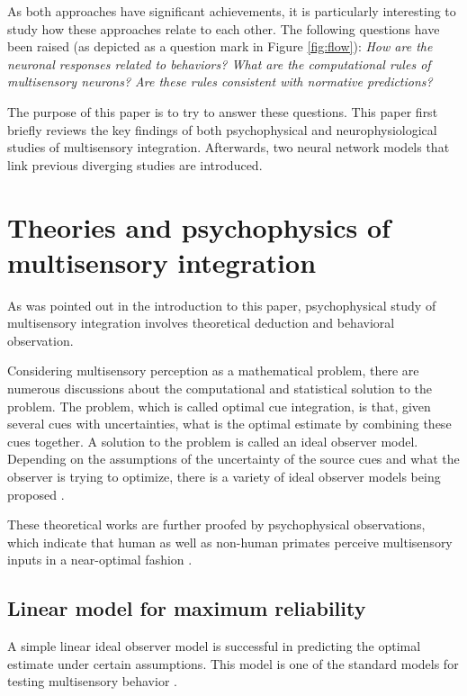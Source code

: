 \documentclass{article}[11pt]
\begin{document}
As both approaches have significant achievements, it is particularly interesting to study how these approaches relate to each other. The following questions have been raised (as depicted as a question mark in Figure \ref{fig:flow}): \emph{How are the neuronal responses related to behaviors? What are the computational rules of multisensory neurons? Are these rules consistent with normative predictions?} 

The purpose of this paper is to try to answer these questions. This paper first briefly reviews the key findings of both psychophysical and neurophysiological studies of multisensory integration. Afterwards, two neural network models that link previous diverging studies are introduced.

\section{Theories and psychophysics of multisensory integration}
As was pointed out in the introduction to this paper, psychophysical study of multisensory integration involves theoretical deduction and behavioral observation.

Considering multisensory perception as a mathematical problem, there are numerous discussions about the computational and statistical solution to the problem. The problem, which is called optimal cue integration, is that, given several cues with uncertainties, what is the optimal estimate by combining these cues together. A solution to the problem is called an ideal observer model. Depending on the assumptions of the uncertainty of the source cues and what the observer is trying to optimize, there is a variety of ideal observer models being proposed \cite{landy_ideal-observer_2011}.

These theoretical works are further proofed by psychophysical observations, which indicate that human as well as non-human primates perceive multisensory inputs in a near-optimal fashion \cite{ernst_humans_2002,alais_ventriloquist_2004,gu_neural_2008}.

\subsection{Linear model for maximum reliability}
A simple linear ideal observer model is successful in predicting the optimal estimate under certain assumptions. This model is one of the standard models for testing multisensory behavior \cite{landy_ideal-observer_2011}.
\end{document}
